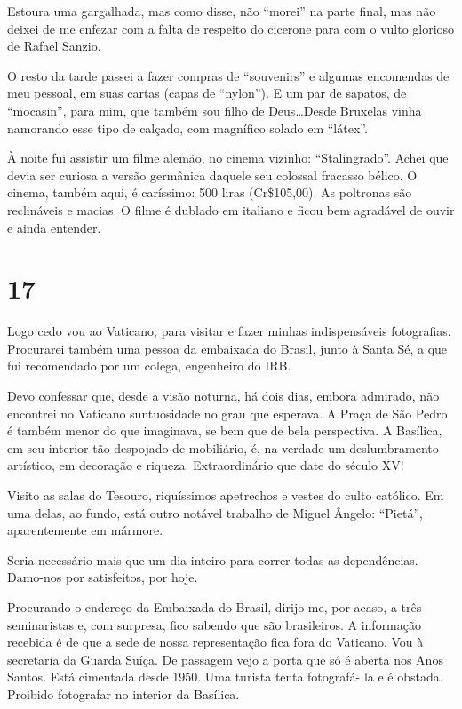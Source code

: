 Estoura uma gargalhada, mas como disse, não “morei” na parte final, mas não deixei de me enfezar com a falta de respeito do cicerone para com o vulto glorioso de Rafael Sanzio.

O resto da tarde passei a fazer compras de “souvenirs” e algumas encomendas de meu pessoal, em suas cartas (capas de “nylon”). E um par de sapatos, de “mocasin”, para mim, que também sou filho de Deus\ldots Desde Bruxelas vinha namorando esse tipo de calçado, com magnífico solado em “látex”.

À noite fui assistir um filme alemão, no cinema vizinho: “Stalingrado”. Achei que devia ser curiosa a versão germânica daquele seu colossal fracasso bélico. O cinema, também aqui, é caríssimo: 500 liras (Cr\$105,00). As poltronas são reclináveis e macias. O filme é dublado em italiano e ficou bem agradável de ouvir e ainda entender.

\section*{17 \adfflatleafright {}}
Logo cedo vou ao Vaticano, para visitar e fazer minhas indispensáveis fotografias. Procurarei também uma pessoa da embaixada do Brasil, junto à Santa Sé, a que fui recomendado por um colega, engenheiro do IRB.

Devo confessar que, desde a visão noturna, há dois dias, embora admirado, não encontrei no Vaticano suntuosidade no grau que esperava. A Praça de São Pedro é também menor do que imaginava, se bem que de bela perspectiva. A Basílica, em seu interior tão despojado de mobiliário, é, na verdade um deslumbramento artístico, em decoração e riqueza. Extraordinário que date do século XV!

Visito as salas do Tesouro, riquíssimos apetrechos e vestes do culto católico. Em uma delas, ao fundo, está outro notável trabalho de Miguel Ângelo: “Pietá”, aparentemente em mármore.

Seria necessário mais que um dia inteiro para correr todas as dependências. Damo-nos por satisfeitos, por hoje.

Procurando o endereço da Embaixada do Brasil, dirijo-me, por acaso, a três seminaristas e, com surpresa, fico sabendo que são brasileiros. A informação recebida é de que a sede de nossa representação fica fora do Vaticano. Vou à secretaria da Guarda Suíça. De passagem vejo a porta que só é aberta nos Anos Santos. Está cimentada desde 1950. Uma turista tenta fotografá- la e é obstada. Proibido fotografar no interior da Basílica.

